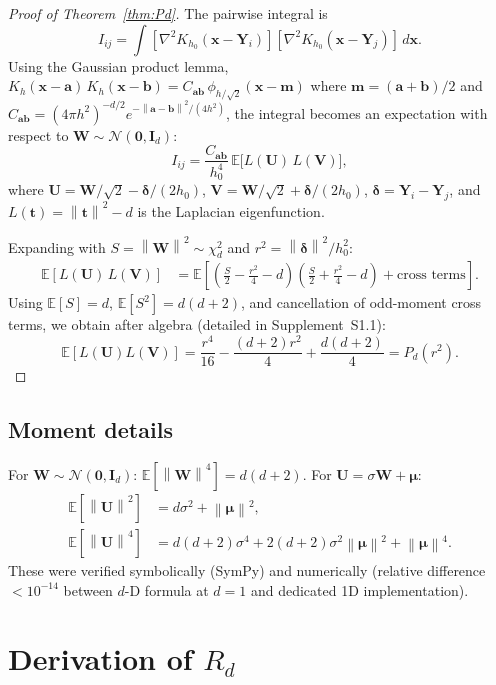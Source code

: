 \documentclass[12pt]{article}
\newcommand{\E}{\mathbb{E}}
\newcommand{\bx}{\bm{x}}
\newcommand{\bY}{\bm{Y}}
\newcommand{\bW}{\bm{W}}
\newcommand{\Id}{\bm{I}_d}
\newcommand{\norm}[1]{\left\| #1 \right\|}
\begin{document}
\begin{proof}[Proof of Theorem~\ref{thm:Pd}]
The pairwise integral is
\[
I_{ij} = \int [\nabla^2 K_{h_0}(\bx - \bY_i)][\nabla^2 K_{h_0}(\bx - \bY_j)]\,d\bx.
\]
Using the Gaussian product lemma, $K_h(\bx{-}\bm{a})\,K_h(\bx{-}\bm{b}) = C_{\bm{ab}}\,\phi_{h/\sqrt2}(\bx - \bm{m})$ where $\bm{m} = (\bm{a}{+}\bm{b})/2$ and $C_{\bm{ab}} = (4\pi h^2)^{-d/2}e^{-\norm{\bm{a}-\bm{b}}^2/(4h^2)}$, the integral becomes an expectation with respect to $\bW \sim \mathcal{N}(\bm{0}, \Id)$:
\[
I_{ij} = \frac{C_{\bm{ab}}}{h_0^4}\,\E\bigl[L(\bm{U})\,L(\bm{V})\bigr],
\]
where $\bm{U} = \bW/\sqrt2 - \bm{\delta}/(2h_0)$, $\bm{V} = \bW/\sqrt2 + \bm{\delta}/(2h_0)$, $\bm{\delta} = \bY_i - \bY_j$, and $L(\bm{t}) = \norm{\bm{t}}^2 - d$ is the Laplacian eigenfunction.

Expanding with $S = \norm{\bW}^2 \sim \chi^2_d$ and $r^2 = \norm{\bm{\delta}}^2/h_0^2$:
\begin{align*}
\E[L(\bm{U})\,L(\bm{V})] &= \E\!\left[\left(\tfrac{S}{2} - \tfrac{r^2}{4} - d\right)\!\left(\tfrac{S}{2} + \tfrac{r^2}{4} - d\right) + \text{cross terms}\right].
\end{align*}
Using $\E[S] = d$, $\E[S^2] = d(d{+}2)$, and cancellation of odd-moment cross terms, we obtain after algebra (detailed in Supplement~S1.1):
\[
\E[L(\bm{U})L(\bm{V})] = \frac{r^4}{16} - \frac{(d{+}2)r^2}{4} + \frac{d(d{+}2)}{4} = P_d(r^2).
\]
\end{proof}

\subsection{Moment details}
\label{sec:supp_moments}
For $\bW \sim \mathcal{N}(\bm 0, \Id)$: $\E[\norm{\bW}^4] = d(d+2)$. For $\bm{U} = \sigma\bW + \bm\mu$:
\begin{align*}
\E[\norm{\bm{U}}^2] &= d\sigma^2 + \norm{\bm\mu}^2,\\
\E[\norm{\bm{U}}^4] &= d(d{+}2)\sigma^4 + 2(d{+}2)\sigma^2\norm{\bm\mu}^2 + \norm{\bm\mu}^4.
\end{align*}
These were verified symbolically (SymPy) and numerically (relative difference $<10^{-14}$ between $d$-D formula at $d{=}1$ and dedicated 1D implementation).

\section{Derivation of $R_d$}
\label{sec:supp_Rd}
\end{document}
